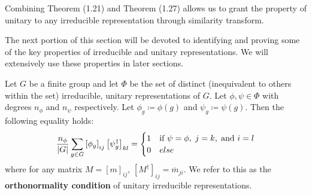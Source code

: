 \begin{remark}
	Combining Theorem (1.21) and Theorem (1.27) allows us to grant the property of unitary to any irreducible representation through similarity transform. 
\end{remark}

The next portion of this section will be devoted to identifying and proving some of the key properties of irreducible and unitary representations. We will extensively use these properties in later sections.

\begin{theorem}
	Let $G$ be a finite group and let $\Phi$ be the set of distinct (inequivalent to others within the set) irreducible, unitary representations of $G$. Let $\phi,\psi \in \Phi$ with degrees $n_{\phi}$ and $n_{\psi}$ respectively. Let $\phi_g \coloneq \phi(g)$ and $\psi_g \coloneq \psi(g)$. Then the following equality holds:
$$\frac{n_\phi}{|G|} \sum_{g\in G} \left[\phi_g \right]_{ij} \left[\psi_g^\dag \right]_{kl} = \begin{cases}
																						1 & \text{if } \psi = \phi,\hspace{1mm} j=k,\hspace{1mm} \text{and } i=l\\
																						0 & else
																					 \end{cases}$$
where for any matrix $M=\left[m\right]_{ij}$, $\left[M^\dag\right]_{ij} = \overline{m}_{ji} $. We refer to this as the \textbf{orthonormality condition} of unitary irreducible representations.
\end{theorem}

